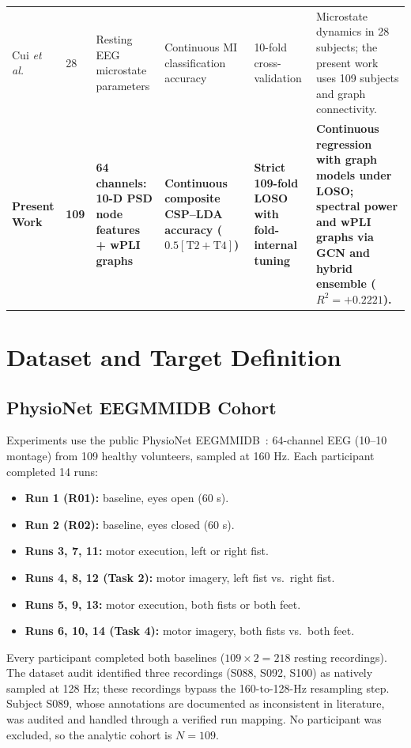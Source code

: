 \documentclass{ieeeaccess}
\begin{document}
\begin{table}[!t]
\begin{tabularx}{\textwidth}{p{2.4cm}p{0.7cm}p{2.6cm}p{2.3cm}p{2.2cm}X}
Cui \textit{et al.}~\cite{cui2023} & 28 & Resting EEG microstate parameters & Continuous MI classification accuracy & 10-fold cross-validation & Microstate dynamics in 28 subjects; the present work uses 109 subjects and graph connectivity.\\
\textbf{Present Work} & \textbf{109} & \textbf{64 channels: 10-D PSD node features + wPLI graphs} & \textbf{Continuous composite CSP--LDA accuracy ($0.5[\text{T2}+\text{T4}]$)} & \textbf{Strict 109-fold LOSO with fold-internal tuning} & \textbf{Continuous regression with graph models under LOSO; spectral power and wPLI graphs via GCN and hybrid ensemble ($R^2=+0.2221$).}\\
\bottomrule
\end{tabularx}
\end{table}

\section{Dataset and Target Definition}

\subsection{PhysioNet EEGMMIDB Cohort}

Experiments use the public PhysioNet EEGMMIDB~\cite{goldberger2000,schalk2004,physionet2009}: 64-channel EEG (10--10 montage) from 109 healthy volunteers, sampled at 160 Hz. Each participant completed 14 runs:

\begin{itemize}[leftmargin=*]
    \item \textbf{Run 1 (R01):} baseline, eyes open (60 s).
    \item \textbf{Run 2 (R02):} baseline, eyes closed (60 s).
    \item \textbf{Runs 3, 7, 11:} motor execution, left or right fist.
    \item \textbf{Runs 4, 8, 12 (Task 2):} motor imagery, left fist vs.\ right fist.
    \item \textbf{Runs 5, 9, 13:} motor execution, both fists or both feet.
    \item \textbf{Runs 6, 10, 14 (Task 4):} motor imagery, both fists vs.\ both feet.
\end{itemize}

Every participant completed both baselines ($109\times2=218$ resting recordings). The dataset audit identified three recordings (S088, S092, S100) as natively sampled at 128 Hz; these recordings bypass the 160-to-128-Hz resampling step. Subject S089, whose annotations are documented as inconsistent in literature, was audited and handled through a verified run mapping. No participant was excluded, so the analytic cohort is $N=109$.
\end{document}
